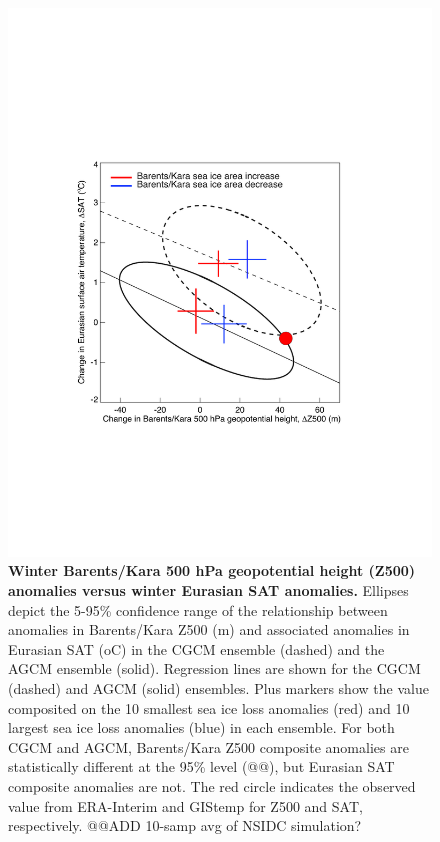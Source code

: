 \documentclass{nature}
\begin{document}
\begin{figure}%
\centering
\noindent\includegraphics[width=35pc]{Word/Figure_3.pdf}
\caption{\textbf{Winter Barents/Kara 500 hPa geopotential height (Z500) anomalies versus winter Eurasian SAT anomalies.} Ellipses depict the 5-95\% confidence range of the relationship between anomalies in Barents/Kara Z500 (m) and associated anomalies in Eurasian SAT (oC) in the CGCM ensemble (dashed) and the AGCM ensemble (solid). Regression lines are shown for the CGCM (dashed) and AGCM (solid) ensembles. Plus markers show the value composited on the 10 smallest sea ice loss anomalies (red) and 10 largest sea ice loss anomalies (blue) in each ensemble. For both CGCM and AGCM, Barents/Kara Z500 composite anomalies are statistically different at the 95\% level (@@), but Eurasian SAT composite anomalies are not. The red circle indicates the observed value from ERA-Interim and GIStemp for Z500 and SAT, respectively. @@ADD 10-samp avg of NSIDC simulation?
}
\label{fig:fig3} 
\end{figure}
\end{document}
